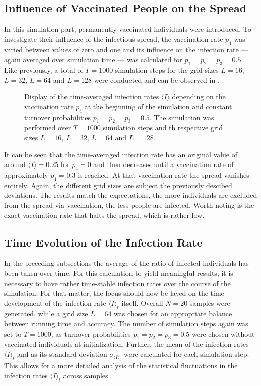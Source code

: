 \subsection{Influence of Vaccinated People on the Spread}

In this simulation part, permanently vaccinated individuals \vaccinated{} were introduced. To investigate their influence of the infectious spread, the vaccination rate $p_4$ was varied between values of zero and one
and its influence on the infection rate --- again averaged over simulation time --- was calculated for $p_1=p_2=p_3=0.5$. Like previously, a total of $T=1000$ simulation steps for the grid sizes 
$L=16$, $L=32$, $L=64$ and $L=128$ were conducted and can be observed in . 

\begin{figure}[ht]
    \centering
    \resizebox{\textwidth}{!}{}
    \caption{Display of the time-averaged infection rates $\overline{\langle I\rangle}$ depending on the vaccination rate $p_4$ at the beginning of the simulation and constant turnover probabilities
    $p_1=p_2=p_3=0.5$. The simulation was performed over $T=1000$ simulation steps and th respective grid sizes $L=16$, $L=32$, $L=64$ and $L=128$.}\label{fig:res_dis_avg_inf_over_p4}
\end{figure}

It can be seen that the time-averaged infection rate has an original value of around $\overline{\langle I\rangle}=0.25$ for $p_4=0$ and then decreases until a vaccination rate of approximately $p_4=0.3$ is reached.
At that vaccination rate the spread vanishes entirely. Again, the different grid sizes are subject the previously descibed deviations. 
The results match the expectations, the more individuals are excluded from the spread via vaccination, the less people are infected. 
Worth noting is the exact vaccination rate that halts the spread, which is rather low.


\subsection{Time Evolution of the Infection Rate}

In the preceding subsections the average of the ratio of infected individuals has been taken over time. For this calculation to yield meaningful results, it is necessary to have
rather time-stable infection rates over the course of the simulation. For that matter, the focus should now be layed on the time development of the infection rate $\langle I\rangle_t$ itself.
Overall $N=20$ samples were generated, while a grid size $L=64$ was chosen for an appropriate balance between running time and accuracy. The number of simulation steps again was set to $T=1000$,
as turnover probabilities $p_1=p_2=p_3=0.5$ were chosen without vaccinated individuals at initialization. 
Further, the mean of the infection rates $\overline{\langle I\rangle_t}$ and as its standard deviation $\sigma_{\langle I\rangle_t}$ were calculated for each simulation step. 
This allows for a more detailed analysis of the statistical fluctuations in the infection rates $\langle I\rangle_t$ across samples. 

